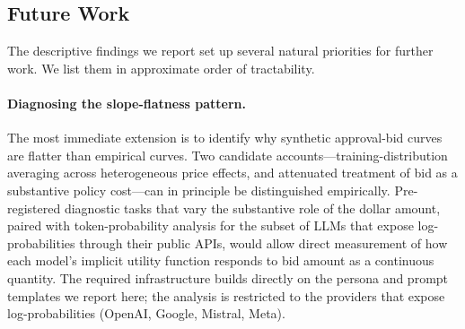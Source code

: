 \documentclass[12pt]{article}
\begin{document}
\subsection{Future Work}\label{sec:disc-future-work}

The descriptive findings we report set up several natural priorities for
further work. We list them in approximate order of tractability.

\paragraph{Diagnosing the slope-flatness pattern.} The most immediate
extension is to identify why synthetic approval-bid curves are flatter
than empirical curves. Two candidate accounts---training-distribution
averaging across heterogeneous price effects, and attenuated treatment
of bid as a substantive policy cost---can in principle be distinguished
empirically. Pre-registered diagnostic tasks that vary the substantive
role of the dollar amount, paired with token-probability analysis for
the subset of LLMs that expose log-probabilities through their public
APIs, would allow direct measurement of how each model's implicit
utility function responds to bid amount as a continuous quantity. The
required infrastructure builds directly on the persona and prompt
templates we report here; the analysis is restricted to the providers
that expose log-probabilities (OpenAI, Google, Mistral, Meta).

\end{document}
